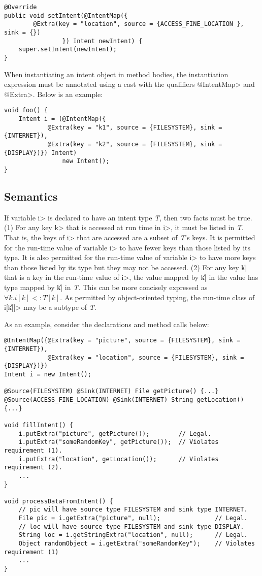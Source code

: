 \begin{Verbatim}
@Override
public void setIntent(@IntentMap({
        @Extra(key = "location", source = {ACCESS_FINE_LOCATION }, sink = {})
                }) Intent newIntent) {
    super.setIntent(newIntent);
}
\end{Verbatim}

When instantiating an intent object in method bodies, the instantiation
expression must be annotated using a cast with the qualifiers \<@IntentMap> and
\<@Extra>. Below is an example:

\begin{Verbatim}
void foo() {
    Intent i = (@IntentMap({
            @Extra(key = "k1", source = {FILESYSTEM}, sink = {INTERNET}),
            @Extra(key = "k2", source = {FILESYSTEM}, sink = {DISPLAY})}) Intent)
                new Intent();
}
\end{Verbatim}


\subsection{Semantics}
If variable \<i> is declared to have an intent type \textit{T}, then two facts must be
true. (1) For any key \<k> that is accessed at run time in \<i>, it must be
listed in \textit{T}. That is, the keys of \<i> that are accessed are
a subset of \textit{T}'s keys. It is
permitted for the run-time value of variable \<i> to have fewer keys than those
listed by its type. It is also permitted for the run-time value of variable
\<i> to have more keys than those listed by its type but they may not be
accessed. (2) For any key \|k| that is a key in the run-time value of \<i>,
the value mapped by \|k| in the value has type mapped by \|k| in \textit{T}. 
This can be more concisely expressed as $\forall k.i[k] <: T[k]$. As permitted
by object-oriented typing, the run-time class of \<i[\|k|]> may be a subtype of \textit{T}.

As an example, consider the declarations and method calls below:

\begin{Verbatim}
@IntentMap({@Extra(key = "picture", source = {FILESYSTEM}, sink = {INTERNET}),
            @Extra(key = "location", source = {FILESYSTEM}, sink = {DISPLAY})}) 
Intent i = new Intent();

@Source(FILESYSTEM) @Sink(INTERNET) File getPicture() {...}
@Source(ACCESS_FINE_LOCATION) @Sink(INTERNET) String getLocation() {...}

void fillIntent() {
    i.putExtra("picture", getPicture());        // Legal.
    i.putExtra("someRandomKey", getPicture());  // Violates requirement (1).
    i.putExtra("location", getLocation());      // Violates requirement (2).
    ...
}

void processDataFromIntent() {
    // pic will have source type FILESYSTEM and sink type INTERNET.
    File pic = i.getExtra("picture", null);               // Legal.
    // loc will have source type FILESYSTEM and sink type DISPLAY.
    String loc = i.getStringExtra("location", null);      // Legal.
    Object randomObject = i.getExtra("someRandomKey");    // Violates requirement (1)
    ...
}
\end{Verbatim}

